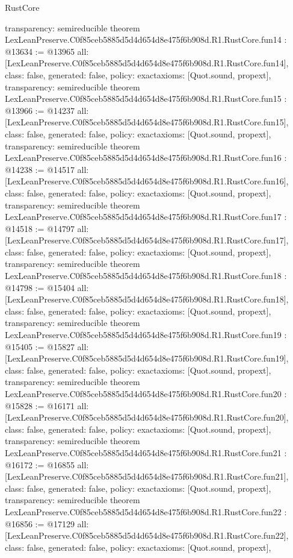 \begin{lexlean}{RustCore}
\begin{coremodule}
{  transparency: semireducible
}
theorem LexLeanPreserve.C0f85ceb5885d5d4d654d8e475f6b908d.R1.RustCore.fun14 : @13634 := @13965 {
  all: [LexLeanPreserve.C0f85ceb5885d5d4d654d8e475f6b908d.R1.RustCore.fun14],
  class: false,
  generated: false,
  policy: exact{axioms: [Quot.sound, propext]},
  transparency: semireducible
}
theorem LexLeanPreserve.C0f85ceb5885d5d4d654d8e475f6b908d.R1.RustCore.fun15 : @13966 := @14237 {
  all: [LexLeanPreserve.C0f85ceb5885d5d4d654d8e475f6b908d.R1.RustCore.fun15],
  class: false,
  generated: false,
  policy: exact{axioms: [Quot.sound, propext]},
  transparency: semireducible
}
theorem LexLeanPreserve.C0f85ceb5885d5d4d654d8e475f6b908d.R1.RustCore.fun16 : @14238 := @14517 {
  all: [LexLeanPreserve.C0f85ceb5885d5d4d654d8e475f6b908d.R1.RustCore.fun16],
  class: false,
  generated: false,
  policy: exact{axioms: [Quot.sound, propext]},
  transparency: semireducible
}
theorem LexLeanPreserve.C0f85ceb5885d5d4d654d8e475f6b908d.R1.RustCore.fun17 : @14518 := @14797 {
  all: [LexLeanPreserve.C0f85ceb5885d5d4d654d8e475f6b908d.R1.RustCore.fun17],
  class: false,
  generated: false,
  policy: exact{axioms: [Quot.sound, propext]},
  transparency: semireducible
}
theorem LexLeanPreserve.C0f85ceb5885d5d4d654d8e475f6b908d.R1.RustCore.fun18 : @14798 := @15404 {
  all: [LexLeanPreserve.C0f85ceb5885d5d4d654d8e475f6b908d.R1.RustCore.fun18],
  class: false,
  generated: false,
  policy: exact{axioms: [Quot.sound, propext]},
  transparency: semireducible
}
theorem LexLeanPreserve.C0f85ceb5885d5d4d654d8e475f6b908d.R1.RustCore.fun19 : @15405 := @15827 {
  all: [LexLeanPreserve.C0f85ceb5885d5d4d654d8e475f6b908d.R1.RustCore.fun19],
  class: false,
  generated: false,
  policy: exact{axioms: [Quot.sound, propext]},
  transparency: semireducible
}
theorem LexLeanPreserve.C0f85ceb5885d5d4d654d8e475f6b908d.R1.RustCore.fun20 : @15828 := @16171 {
  all: [LexLeanPreserve.C0f85ceb5885d5d4d654d8e475f6b908d.R1.RustCore.fun20],
  class: false,
  generated: false,
  policy: exact{axioms: [Quot.sound, propext]},
  transparency: semireducible
}
theorem LexLeanPreserve.C0f85ceb5885d5d4d654d8e475f6b908d.R1.RustCore.fun21 : @16172 := @16855 {
  all: [LexLeanPreserve.C0f85ceb5885d5d4d654d8e475f6b908d.R1.RustCore.fun21],
  class: false,
  generated: false,
  policy: exact{axioms: [Quot.sound, propext]},
  transparency: semireducible
}
theorem LexLeanPreserve.C0f85ceb5885d5d4d654d8e475f6b908d.R1.RustCore.fun22 : @16856 := @17129 {
  all: [LexLeanPreserve.C0f85ceb5885d5d4d654d8e475f6b908d.R1.RustCore.fun22],
  class: false,
  generated: false,
  policy: exact{axioms: [Quot.sound, propext]},
}
\end{coremodule}
\end{lexlean}
